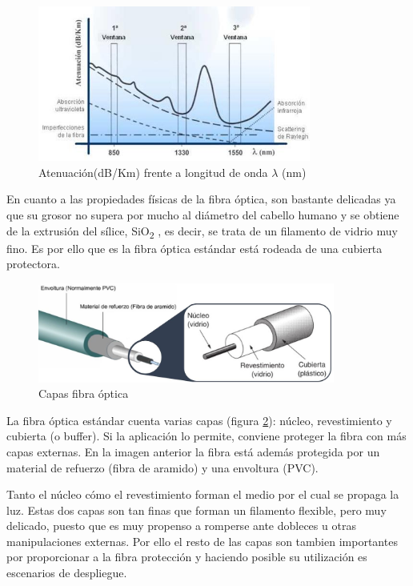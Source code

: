  	\begin{figure}[H]
 		\centering
 		\includegraphics[width=0.8\textwidth]{./img/perdidasFrec}
 		\caption{Atenuación(dB/Km) frente a longitud de onda  $\lambda$ (nm) \cite{imgRadioModo}}
 		\label{fig:perdidasFrec}
 	\end{figure}

 En cuanto a las propiedades físicas de la fibra óptica, son bastante delicadas ya que su grosor no supera por mucho al diámetro del cabello humano y se obtiene de la extrusión del sílice, SiO\textsubscript{2} , es decir, se trata de un filamento de vidrio muy fino. Es por ello que es la fibra óptica estándar está rodeada de una cubierta protectora. 
 
  \begin{figure}[H]
  	\centering
  	\includegraphics[width=0.87\textwidth]{./img/capas-fibra2}
  	\caption{Capas fibra óptica \cite{imgNucleoFibra,imgCapasFO}} 
  	\label{fig:capasFibra}
  \end{figure} 
  
  
  
 La fibra óptica estándar cuenta varias capas (figura \ref{fig:capasFibra}): núcleo, revestimiento y cubierta (o buffer).  Si la aplicación lo permite, conviene proteger la fibra con más capas externas. En la imagen anterior la fibra está además protegida por un material de refuerzo (fibra de aramido) y una envoltura (PVC).
 
 Tanto el núcleo cómo el revestimiento forman el medio por el cual se propaga la luz. Estas dos capas son tan finas que forman un filamento flexible, pero muy delicado, puesto que es muy propenso a romperse ante dobleces u otras manipulaciones externas. Por ello el resto de las capas son tambien importantes por proporcionar a la fibra protección y haciendo posible su utilización es escenarios de despliegue.
 
